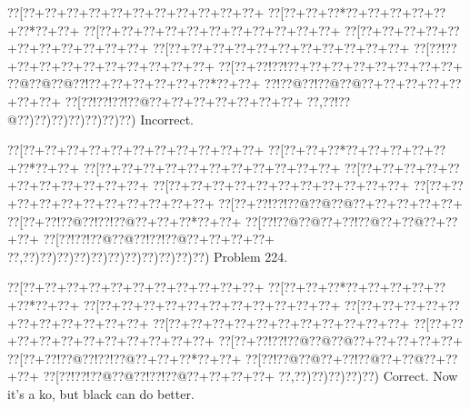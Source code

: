 \documentclass[a5paper]{article}
\begin{document}
\begin{center}
{\goo
\0??[\0??+\0??+\0??+\0??+\0??+\0??+\0??+\0??+\0??+\0??+\0??+
\0??[\0??+\0??+\0??*\0??+\0??+\0??+\0??+\0??+\0??*\0??+\0??+
\0??[\0??+\0??+\0??+\0??+\0??+\0??+\0??+\0??+\0??+\0??+\0??+
\0??[\0??+\0??+\0??+\0??+\0??+\0??+\0??+\0??+\0??+\0??+\0??+
\0??[\0??+\0??+\0??+\0??+\0??+\0??+\0??+\0??+\0??+\0??+\0??+
\0??[\0??!\0??+\0??+\0??+\0??+\0??+\0??+\0??+\0??+\0??+\0??+
\0??[\0??+\0??!\0??!\0??+\0??+\0??+\0??+\0??+\0??+\0??+\0??+
\0??@\0??@\0??@\0??!\0??+\0??+\0??+\0??+\0??+\0??*\0??+\0??+
\0??!\0??@\0??!\0??@\0??@\0??+\0??+\0??+\0??+\0??+\0??+\0??+
\0??[\0??!\0??!\0??!\0??@\0??+\0??+\0??+\0??+\0??+\0??+\0??+
\0??,\0??!\0??@\0??)\0??)\0??)\0??)\0??)\0??)\0??)
}
Incorrect. 

\end{center}
\newpage
\begin{center}
{\goo
\0??[\0??+\0??+\0??+\0??+\0??+\0??+\0??+\0??+\0??+\0??+\0??+
\0??[\0??+\0??+\0??*\0??+\0??+\0??+\0??+\0??+\0??*\0??+\0??+
\0??[\0??+\0??+\0??+\0??+\0??+\0??+\0??+\0??+\0??+\0??+\0??+
\0??[\0??+\0??+\0??+\0??+\0??+\0??+\0??+\0??+\0??+\0??+\0??+
\0??[\0??+\0??+\0??+\0??+\0??+\0??+\0??+\0??+\0??+\0??+\0??+
\0??[\0??+\0??+\0??+\0??+\0??+\0??+\0??+\0??+\0??+\0??+\0??+
\0??[\0??+\0??!\0??!\0??@\0??@\0??@\0??+\0??+\0??+\0??+\0??+
\0??[\0??+\0??!\0??@\0??!\0??!\0??@\0??+\0??+\0??*\0??+\0??+
\0??[\0??!\0??@\0??@\0??+\0??!\0??@\0??+\0??@\0??+\0??+\0??+
\0??[\0??!\0??!\0??@\0??@\0??!\0??!\0??@\0??+\0??+\0??+\0??+
\0??,\0??)\0??)\0??)\0??)\0??)\0??)\0??)\0??)\0??)\0??)\0??)
}
Problem 224.

\end{center}
\begin{center}
{\goo
\0??[\0??+\0??+\0??+\0??+\0??+\0??+\0??+\0??+\0??+\0??+\0??+
\0??[\0??+\0??+\0??*\0??+\0??+\0??+\0??+\0??+\0??*\0??+\0??+
\0??[\0??+\0??+\0??+\0??+\0??+\0??+\0??+\0??+\0??+\0??+\0??+
\0??[\0??+\0??+\0??+\0??+\0??+\0??+\0??+\0??+\0??+\0??+\0??+
\0??[\0??+\0??+\0??+\0??+\0??+\0??+\0??+\0??+\0??+\0??+\0??+
\0??[\0??+\0??+\0??+\0??+\0??+\0??+\0??+\0??+\0??+\0??+\0??+
\0??[\0??+\0??!\0??!\0??@\0??@\0??@\0??+\0??+\0??+\0??+\0??+
\0??[\0??+\0??!\0??@\0??!\0??!\0??@\0??+\0??+\0??*\0??+\0??+
\0??[\0??!\0??@\0??@\0??+\0??!\0??@\0??+\0??@\0??+\0??+\0??+
\0??[\0??!\0??!\0??@\0??@\0??!\0??!\0??@\0??+\0??+\0??+\0??+
\0??,\0??)\0??)\0??)\0??)\0??)
}
Correct. Now it's a ko, but black can do better.

\end{center}
\end{document}
